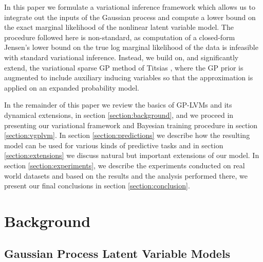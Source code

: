 \documentclass [10pt , a4paper]{article}
\begin{document}
\par In this paper we formulate a variational inference framework which allows us to integrate out the inputs of the
Gaussian process and compute a lower bound on the exact marginal likelihood of the nonlinear latent variable model. The
procedure followed here is non-standard, as computation of a closed-form Jensen's lower bound on the true log marginal
 likelihood of the data is infeasible with standard variational inference. Instead, 
we build on, and significantly extend, the variational sparse GP method of Titsias \cite{Titsias:variational09}, where the GP prior is 
augmented to include auxiliary inducing variables so that the approximation is applied on an expanded probability model. 

\par In the remainder of this paper we review the basics of GP-LVMs and its dynamical extensions,
 in section \ref{section:background}, and we proceed in presenting our variational framework and 
 Bayesian training procedure in section \ref{section:vgplvm}. In section \ref{section:predictions} we
 describe how the resulting model can be used for various kinds of predictive tasks and in section \ref{section:extensions}
we discuss natural but important extensions of our model. In section \ref{section:experiments}, we
 describe the experiments conducted on real world datasets and based on the results and
the analysis performed there, we present our final conclusions
in section \ref{section:conclusion}.



\section{Background \label{section:background}}
\subsection{Gaussian Process Latent Variable Models}
\end{document}

